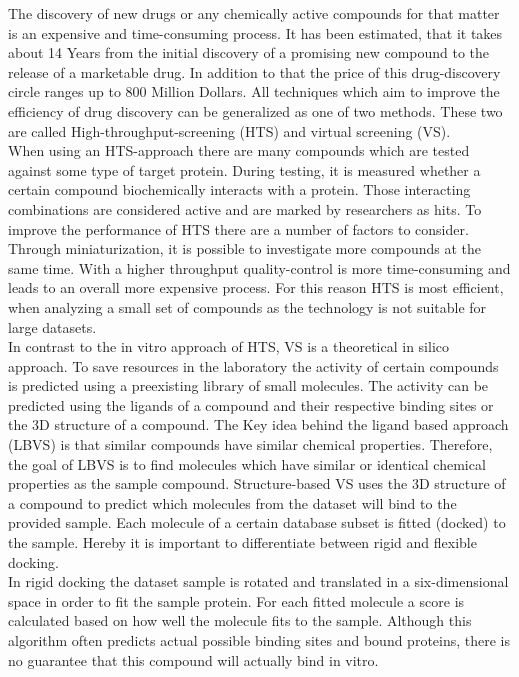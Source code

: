 The discovery of new drugs or any chemically active compounds for that matter is an expensive and 
time-consuming process. It has been estimated, that it takes about 14 Years from the initial
discovery of a promising new compound to the release of a marketable drug\cite{Myers2001}. In 
addition to that the price of this drug-discovery circle ranges up to 800 Million Dollars\cite{DiMasi2003}.
All techniques which aim to improve the efficiency of drug discovery can be generalized as one of two methods. 
These two are called High-throughput-screening (HTS) and virtual screening (VS).
\\
When using an HTS-approach there are many compounds which are tested 
against some type of target protein. During testing, it is measured whether 
a certain compound biochemically interacts with a protein. Those interacting combinations 
are considered active and are marked by researchers as hits. To improve the performance of HTS there are a number of
factors to consider. Through miniaturization, it is possible to investigate more compounds at the same time. 
With a higher throughput quality-control is more time-consuming and leads to an overall more expensive process.
For this reason HTS is most efficient, when analyzing a small set of compounds as the technology is not 
suitable for large datasets\cite{Mayr2008}.
\\
In contrast to the in vitro approach of HTS, VS is a theoretical in silico approach. To save resources in the laboratory 
the activity of certain compounds is predicted using a preexisting library of small molecules. 
The activity can be predicted using the ligands of a compound and their respective binding sites or the 3D structure of a compound.
The Key idea behind the ligand based approach (LBVS) is that similar compounds have similar chemical properties.
Therefore, the goal of LBVS is to find molecules which have similar or identical chemical properties as the sample compound\cite{Gimeno2019}.
Structure-based VS uses the 3D structure of a compound to predict which molecules from the dataset will bind to the provided sample.
Each molecule of a certain database subset is fitted (docked) to the sample.
Hereby it is important to differentiate between rigid and flexible docking.
\\
In rigid docking the dataset sample is rotated and translated in a six-dimensional space in order to fit the sample protein.
For each fitted molecule a score is calculated based on how well the molecule fits to the sample\cite{Lavecchia2013}.
Although this algorithm often predicts actual possible binding sites and bound proteins, there is no guarantee that this compound will actually bind in vitro. 
